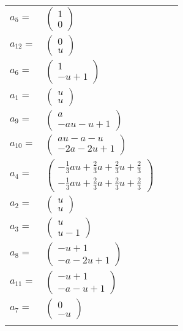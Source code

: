 \documentclass[1p]{elsarticle_modified}
\theoremstyle{definition}
\begin{document}
\begin{tabular}{m{7pt} m{180pt} m{7pt} m{180pt} }
\flushright $a_{5}=$&$\begin{pmatrix}1\\0\end{pmatrix}$ \\
\flushright $a_{12}=$&$\begin{pmatrix}0\\u\end{pmatrix}$ \\
\flushright $a_{6}=$&$\begin{pmatrix}1\\- u+1\end{pmatrix}$ \\
\flushright $a_{1}=$&$\begin{pmatrix}u\\u\end{pmatrix}$ \\
\flushright $a_{9}=$&$\begin{pmatrix}a\\- a u- u+1\end{pmatrix}$ \\
\flushright $a_{10}=$&$\begin{pmatrix}a u- a- u\\-2 a-2 u+1\end{pmatrix}$ \\
\flushright $a_{4}=$&$\begin{pmatrix}-\frac{1}{3} a u+\frac{2}{3} a+\frac{2}{3} u+\frac{2}{3}\\-\frac{1}{3} a u+\frac{2}{3} a+\frac{2}{3} u+\frac{2}{3}\end{pmatrix}$ \\
\flushright $a_{2}=$&$\begin{pmatrix}u\\u\end{pmatrix}$ \\
\flushright $a_{3}=$&$\begin{pmatrix}u\\u-1\end{pmatrix}$ \\
\flushright $a_{8}=$&$\begin{pmatrix}- u+1\\- a-2 u+1\end{pmatrix}$ \\
\flushright $a_{11}=$&$\begin{pmatrix}- u+1\\- a- u+1\end{pmatrix}$ \\
\flushright $a_{7}=$&$\begin{pmatrix}0\\- u\end{pmatrix}$\\&\end{tabular}
\end{document}
